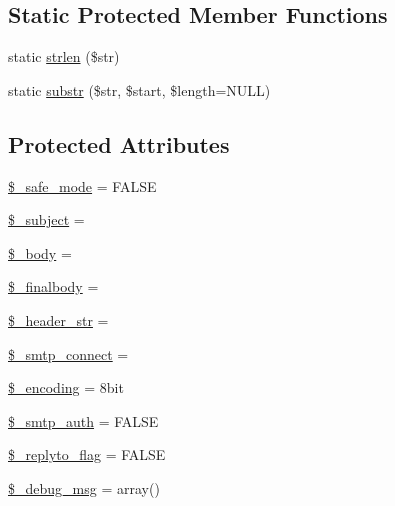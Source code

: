 \subsection*{Static Protected Member Functions}
\begin{DoxyCompactItemize}
\item 
static \mbox{\hyperlink{class_c_i___email_a4c29a687d4ed62c26a10e41d98930d5f}{strlen}} (\$str)
\item 
static \mbox{\hyperlink{class_c_i___email_a101caef57ef0b165da5747e2c2e6c9dc}{substr}} (\$str, \$start, \$length=N\+U\+LL)
\end{DoxyCompactItemize}
\subsection*{Protected Attributes}
\begin{DoxyCompactItemize}
\item 
\mbox{\hyperlink{class_c_i___email_a9f2bbbf11ed324c1744f64d81242e8d5}{\$\+\_\+safe\+\_\+mode}} = F\+A\+L\+SE
\item 
\mbox{\hyperlink{class_c_i___email_a3a212566602bb9c1c34e7619390b1bb8}{\$\+\_\+subject}} = \textquotesingle{}\textquotesingle{}
\item 
\mbox{\hyperlink{class_c_i___email_a2428d6733045fa7c07e5f61c8c85b8c9}{\$\+\_\+body}} = \textquotesingle{}\textquotesingle{}
\item 
\mbox{\hyperlink{class_c_i___email_afe3b263ee6d58805f3c06ef1fdc863a5}{\$\+\_\+finalbody}} = \textquotesingle{}\textquotesingle{}
\item 
\mbox{\hyperlink{class_c_i___email_a551b64b005666b98b001ed7ff405047c}{\$\+\_\+header\+\_\+str}} = \textquotesingle{}\textquotesingle{}
\item 
\mbox{\hyperlink{class_c_i___email_ab15af26ecd0970be1fb7609d06eec5ba}{\$\+\_\+smtp\+\_\+connect}} = \textquotesingle{}\textquotesingle{}
\item 
\mbox{\hyperlink{class_c_i___email_a37d569dfb47810a72ca1cfc5095ad149}{\$\+\_\+encoding}} = \textquotesingle{}8bit\textquotesingle{}
\item 
\mbox{\hyperlink{class_c_i___email_a9b977d5970ceedb6cba44032a9976459}{\$\+\_\+smtp\+\_\+auth}} = F\+A\+L\+SE
\item 
\mbox{\hyperlink{class_c_i___email_a00e8e2c2c72e6acf2cd91a8c4498695a}{\$\+\_\+replyto\+\_\+flag}} = F\+A\+L\+SE
\item 
\mbox{\hyperlink{class_c_i___email_a23c65b604c773811f76e75093fe9a77b}{\$\+\_\+debug\+\_\+msg}} = array()

\end{DoxyCompactItemize}
